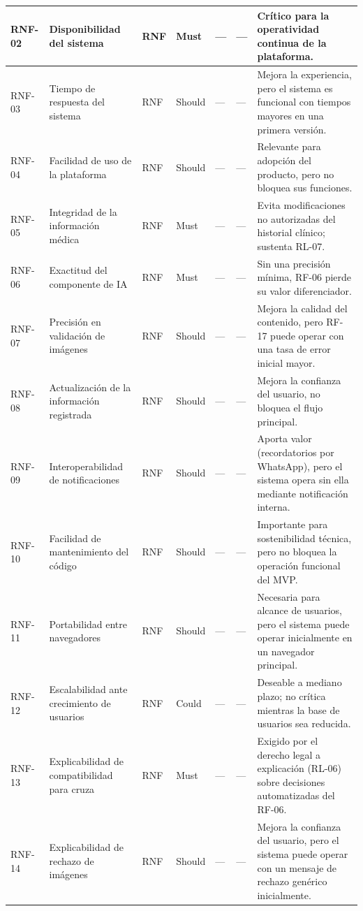 \documentclass[journal,onecolumn]{IEEEtran}
\begin{document}
\begin{landscape}
\begin{longtable}{@{}p{1.2cm} p{5.2cm} p{1.0cm} p{1.3cm} p{1.3cm} p{1.1cm} p{6.5cm}@{}}
			RNF-02 & Disponibilidad del sistema & RNF & Must & --- & --- & Crítico para la operatividad continua de la plataforma. \\ \midrule
			RNF-03 & Tiempo de respuesta del sistema & RNF & Should & --- & --- & Mejora la experiencia, pero el sistema es funcional con tiempos mayores en una primera versión. \\ \midrule
			RNF-04 & Facilidad de uso de la plataforma & RNF & Should & --- & --- & Relevante para adopción del producto, pero no bloquea sus funciones. \\ \midrule
			RNF-05 & Integridad de la información médica & RNF & Must & --- & --- & Evita modificaciones no autorizadas del historial clínico; sustenta RL-07. \\ \midrule
			RNF-06 & Exactitud del componente de IA & RNF & Must & --- & --- & Sin una precisión mínima, RF-06 pierde su valor diferenciador. \\ \midrule
			RNF-07 & Precisión en validación de imágenes & RNF & Should & --- & --- & Mejora la calidad del contenido, pero RF-17 puede operar con una tasa de error inicial mayor. \\ \midrule
			RNF-08 & Actualización de la información registrada & RNF & Should & --- & --- & Mejora la confianza del usuario, no bloquea el flujo principal. \\ \midrule
			RNF-09 & Interoperabilidad de notificaciones & RNF & Should & --- & --- & Aporta valor (recordatorios por WhatsApp), pero el sistema opera sin ella mediante notificación interna. \\ \midrule
			RNF-10 & Facilidad de mantenimiento del código & RNF & Should & --- & --- & Importante para sostenibilidad técnica, pero no bloquea la operación funcional del MVP. \\ \midrule
			RNF-11 & Portabilidad entre navegadores & RNF & Should & --- & --- & Necesaria para alcance de usuarios, pero el sistema puede operar inicialmente en un navegador principal. \\ \midrule
			RNF-12 & Escalabilidad ante crecimiento de usuarios & RNF & Could & --- & --- & Deseable a mediano plazo; no crítica mientras la base de usuarios sea reducida. \\ \midrule
			RNF-13 & Explicabilidad de compatibilidad para cruza & RNF & Must & --- & --- & Exigido por el derecho legal a explicación (RL-06) sobre decisiones automatizadas del RF-06. \\ \midrule
			RNF-14 & Explicabilidad de rechazo de imágenes & RNF & Should & --- & --- & Mejora la confianza del usuario, pero el sistema puede operar con un mensaje de rechazo genérico inicialmente. \\ \midrule

\end{longtable}
\end{landscape}
\end{document}
